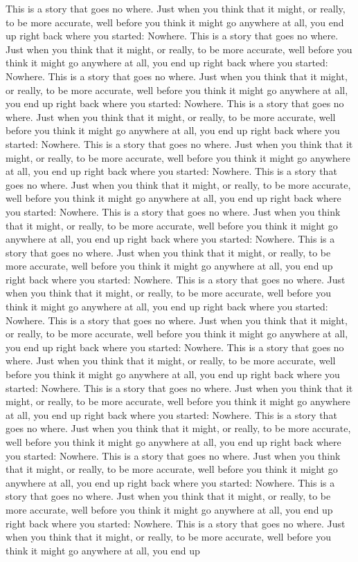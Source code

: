 \documentclass{amsart}
\begin{document}
{        This is a story that goes no where. Just when you think that it might, or really, to be more accurate, well before you think it might go anywhere at all, you end up right back where you started: Nowhere.         This is a story that goes no where. Just when you think that it might, or really, to be more accurate, well before you think it might go anywhere at all, you end up right back where you started: Nowhere.        This is a story that goes no where. Just when you think that it might, or really, to be more accurate, well before you think it might go anywhere at all, you end up right back where you started: Nowhere.        This is a story that goes no where. Just when you think that it might, or really, to be more accurate, well before you think it might go anywhere at all, you end up right back where you started: Nowhere.        This is a story that goes no where. Just when you think that it might, or really, to be more accurate, well before you think it might go anywhere at all, you end up right back where you started: Nowhere.        This is a story that goes no where. Just when you think that it might, or really, to be more accurate, well before you think it might go anywhere at all, you end up right back where you started: Nowhere.        This is a story that goes no where. Just when you think that it might, or really, to be more accurate, well before you think it might go anywhere at all, you end up right back where you started: Nowhere.        This is a story that goes no where. Just when you think that it might, or really, to be more accurate, well before you think it might go anywhere at all, you end up right back where you started: Nowhere.        This is a story that goes no where. Just when you think that it might, or really, to be more accurate, well before you think it might go anywhere at all, you end up right back where you started: Nowhere.        This is a story that goes no where. Just when you think that it might, or really, to be more accurate, well before you think it might go anywhere at all, you end up right back where you started: Nowhere.        This is a story that goes no where. Just when you think that it might, or really, to be more accurate, well before you think it might go anywhere at all, you end up right back where you started: Nowhere.        This is a story that goes no where. Just when you think that it might, or really, to be more accurate, well before you think it might go anywhere at all, you end up right back where you started: Nowhere.        This is a story that goes no where. Just when you think that it might, or really, to be more accurate, well before you think it might go anywhere at all, you end up right back where you started: Nowhere.        This is a story that goes no where. Just when you think that it might, or really, to be more accurate, well before you think it might go anywhere at all, you end up right back where you started: Nowhere.        This is a story that goes no where. Just when you think that it might, or really, to be more accurate, well before you think it might go anywhere at all, you end up right back where you started: Nowhere.  This is a story that goes no where. Just when you think that it might, or really, to be more accurate, well before you think it might go anywhere at all, you end up }
\end{document}
